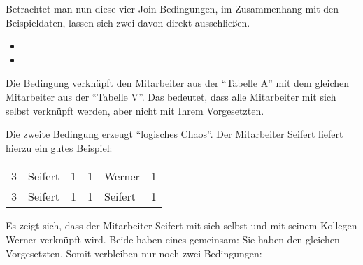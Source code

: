          Betrachtet man nun diese vier Join-Bedingungen, im Zusammenhang mit den Beispieldaten, lassen sich zwei davon direkt ausschließen.
          \begin{itemize}
            \item {}
            \item {}
          \end{itemize}
          Die Bedingung  verknüpft den Mitarbeiter aus der \enquote{Tabelle A} mit dem gleichen Mitarbeiter aus der \enquote{Tabelle V}. Das bedeutet, dass alle Mitarbeiter mit sich selbst verknüpft werden, aber nicht mit Ihrem Vorgesetzten.

          Die zweite Bedingung  erzeugt \enquote{logisches Chaos}. Der Mitarbeiter Seifert liefert hierzu ein gutes Beispiel:
          \begin{center}
            \begin{small}
              \tablehead{}
              \tabletail {}
              \tablelasttail {}
              \begin{msoraclesql}
                \begin{supertabular}{rlrrlr}
                  3 & Seifert & 1 & 1 & Werner & 1 \\
                  3 & Seifert & 1 & 1 & Seifert & 1 \\
                \end{supertabular}
              \end{msoraclesql}
            \end{small}
          \end{center}
          Es zeigt sich, dass der Mitarbeiter Seifert mit sich selbst und mit seinem Kollegen Werner verknüpft wird. Beide haben eines gemeinsam: Sie haben den gleichen Vorgesetzten. Somit verbleiben nur noch zwei Bedingungen:

